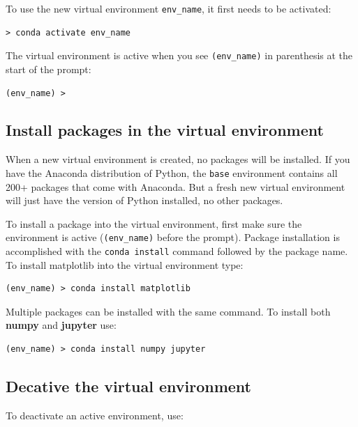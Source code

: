 \documentclass{book}
\begin{document}
To use the new virtual environment \lstinline!env_name!, it first needs
to be activated:

\begin{lstlisting}
> conda activate env_name
\end{lstlisting}

The virtual environment is active when you see \lstinline!(env_name)! in
parenthesis at the start of the prompt:

\begin{lstlisting}
(env_name) > 
\end{lstlisting}

\subsection{Install packages in the virtual
environment}\label{install-packages-in-the-virtual-environment}

When a new virtual environment is created, no packages will be
installed. If you have the Anaconda distribution of Python, the
\lstinline!base! environment contains all 200+ packages that come with
Anaconda. But a fresh new virtual environment will just have the version
of Python installed, no other packages.

To install a package into the virtual environment, first make sure the
environment is active (\lstinline!(env_name)! before the prompt).
Package installation is accomplished with the \lstinline!conda install!
command followed by the package name. To install matplotlib into the
virtual environment type:

\begin{lstlisting}
(env_name) > conda install matplotlib
\end{lstlisting}

Multiple packages can be installed with the same command. To install
both \textbf{numpy} and \textbf{jupyter} use:

\begin{lstlisting}
(env_name) > conda install numpy jupyter
\end{lstlisting}
    




    
        \subsection{Decative the virtual
environment}\label{decative-the-virtual-environment}

To deactivate an active environment, use:
\end{document}
